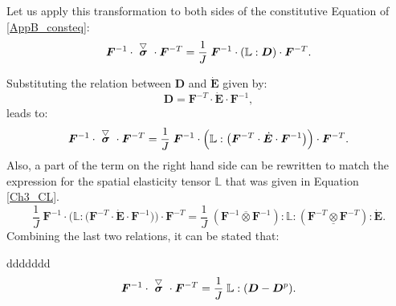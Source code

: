 {{\noindent\makebox[\linewidth]{\rule{\paperwidth}{0.4pt}}
Let us apply this transformation to both sides of the constitutive Equation of \ref{AppB_consteq}:
\begin{equation}
\boldsymbol{F}^{-1}\cdot\acctriang{\boldsymbol{\sigma}}\cdot\boldsymbol{F}^{-T} = \frac{1}{J}\; \boldsymbol{F}^{-1}\cdot(\boldsymbol{\mathbb L}:\boldsymbol{D})\cdot\boldsymbol{F}^{-T}.
\end{equation} 

Substituting the relation between $\boldsymbol{D}$ and $\dot{\boldsymbol{E}}$ given by:
\begin{equation}
\boldsymbol{D} = \boldsymbol{F}^{-T}\cdot\dot{\boldsymbol{E}}\cdot\boldsymbol{F}^{-1},
\end{equation}
leads to:
\begin{equation}
\boldsymbol{F}^{-1}\cdot\acctriang{\boldsymbol{\sigma}}\cdot\boldsymbol{F}^{-T} = \frac{1}{J}\; \boldsymbol{F}^{-1}\cdot\Big(\boldsymbol{\mathbb L}:\big(\boldsymbol{F}^{-T}\cdot\dot{\boldsymbol{E}}\cdot\boldsymbol{F}^{-1}\big)\Big)\cdot\boldsymbol{F}^{-T}.
\end{equation} 
Also, a part of the term on the right hand side can be rewritten to match the expression for the spatial elasticity tensor $\boldsymbol{\mathbb L}$ that was given in Equation \ref{Ch3_CL}. 
\begin{equation}
\frac{1}{J}\; \boldsymbol{F}^{-1}\cdot\Big(\boldsymbol{\mathbb L}:\big(\boldsymbol{F}^{-T}\cdot\dot{\boldsymbol{E}}\cdot\boldsymbol{F}^{-1}\big)\Big)\cdot\boldsymbol{F}^{-T}= \frac{1}{J}\; (\boldsymbol{F}^{-1}\overline{\otimes}\boldsymbol{F}^{-1}):\boldsymbol{\mathbb L}:(\boldsymbol{F}^{-T}\underline{\otimes}\boldsymbol{F}^{-T}):\dot{\boldsymbol{E}}.
\end{equation}
Combining the last two relations, it can be stated that:









ddddddd
\vspace{4cm}
\noindent\makebox[\linewidth]{\rule{\paperwidth}{0.4pt}}
\begin{equation}
\boldsymbol{F}^{-1}\cdot\acctriang{\boldsymbol{\sigma}}\cdot\boldsymbol{F}^{-T} = \frac{1}{J}\; \boldsymbol{\mathbb L}:(\boldsymbol{D}-\boldsymbol{D}^p).
\end{equation} 

}}
